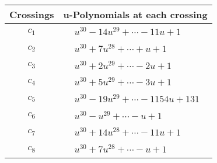 \documentclass[1p]{elsarticle_modified}
\theoremstyle{definition}
\begin{document}
\begin{tabular}{m{50pt}|m{274pt}}
Crossings & \hspace{64pt}u-Polynomials at each crossing \\
\hline $$\begin{aligned}c_{1}\end{aligned}$$&$\begin{aligned}
&u^{30}-14 u^{29}+\cdots-11 u+1
\end{aligned}$\\
\hline $$\begin{aligned}c_{2}\end{aligned}$$&$\begin{aligned}
&u^{30}+7 u^{28}+\cdots+u+1
\end{aligned}$\\
\hline $$\begin{aligned}c_{3}\end{aligned}$$&$\begin{aligned}
&u^{30}+2 u^{29}+\cdots-2 u+1
\end{aligned}$\\
\hline $$\begin{aligned}c_{4}\end{aligned}$$&$\begin{aligned}
&u^{30}+5 u^{29}+\cdots-3 u+1
\end{aligned}$\\
\hline $$\begin{aligned}c_{5}\end{aligned}$$&$\begin{aligned}
&u^{30}-19 u^{29}+\cdots-1154 u+131
\end{aligned}$\\
\hline $$\begin{aligned}c_{6}\end{aligned}$$&$\begin{aligned}
&u^{30}- u^{29}+\cdots- u+1
\end{aligned}$\\
\hline $$\begin{aligned}c_{7}\end{aligned}$$&$\begin{aligned}
&u^{30}+14 u^{28}+\cdots-11 u+1
\end{aligned}$\\
\hline $$\begin{aligned}c_{8}\end{aligned}$$&$\begin{aligned}
&u^{30}+7 u^{28}+\cdots- u+1
\end{aligned}$\\

\end{tabular}
\end{document}
